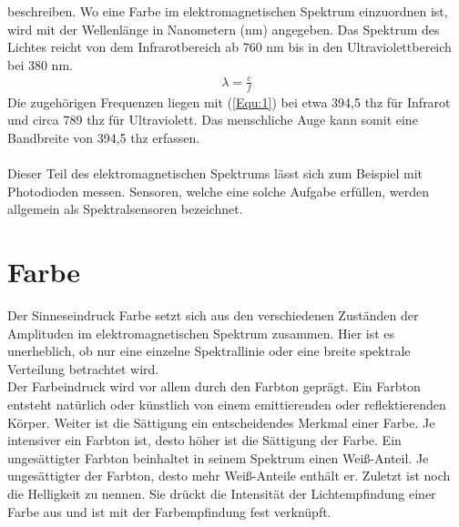 \documentclass[11pt]{scrartcl}
\begin{document}
beschreiben. Wo eine Farbe im elektromagnetischen Spektrum einzuordnen ist, wird mit der Wellenlänge in Nanometern (nm) angegeben. Das
Spektrum des Lichtes reicht von dem Infrarotbereich ab 760 nm bis in den Ultraviolettbereich bei 380 nm.
\begin{align}\label{Equ:1}
    \lambda = \frac{c}{f}
\end{align}
Die zugehörigen Frequenzen liegen mit (\ref{Equ:1}) bei etwa 394,5 \ac{thz} für Infrarot und circa 789 \ac{thz} für Ultraviolett. Das
menschliche Auge kann somit eine Bandbreite von 394,5 \ac{thz} erfassen.\\
\\
Dieser Teil des elektromagnetischen Spektrums lässt sich zum Beispiel mit Photodioden messen. Sensoren, welche eine solche Aufgabe erfüllen,
werden allgemein als Spektralsensoren bezeichnet.
\clearpage

\section{Farbe}
Der Sinneseindruck Farbe setzt sich aus den verschiedenen Zuständen der Amplituden im elektromagnetischen Spektrum zusammen. Hier ist es
unerheblich, ob nur eine einzelne Spektrallinie oder eine breite spektrale Verteilung betrachtet wird.\\
Der Farbeindruck wird vor allem durch den Farbton geprägt. Ein Farbton entsteht natürlich oder künstlich von einem emittierenden oder
reflektierenden Körper. Weiter ist die Sättigung ein entscheidendes Merkmal einer Farbe. Je intensiver ein Farbton ist, desto höher ist
die Sättigung der Farbe. Ein ungesättigter Farbton beinhaltet in seinem Spektrum einen Weiß-Anteil. Je ungesättigter der Farbton, desto
mehr Weiß-Anteile enthält er. Zuletzt ist noch die Helligkeit zu nennen. Sie drückt die Intensität der Lichtempfindung einer Farbe aus und
ist mit der Farbempfindung fest verknüpft.
\end{document}
